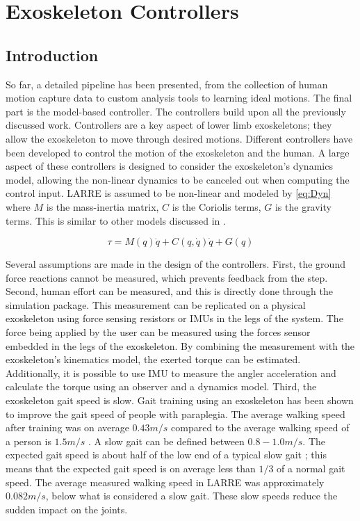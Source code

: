 \chapter{Exoskeleton Controllers}
\label{chap:controllers}
\section{Introduction}
So far, a detailed pipeline has been presented, from the collection of human motion capture data to custom analysis tools to learning ideal motions. The final part is the model-based controller. The controllers build upon all the previously discussed work.  
Controllers are a key aspect of lower limb exoskeletons; they allow the exoskeleton to move through desired motions. Different controllers have been developed to control the motion of the exoskeleton and the human. A large aspect of these controllers is designed to consider the exoskeleton's dynamics model, allowing the non-linear dynamics to be canceled out when computing the control input. LARRE is assumed to be non-linear and modeled by \autoref{eq:Dyn} where $M$ is the mass-inertia matrix, $C$ is the Coriolis terms, $G$ is the gravity terms. This is similar to other models discussed in \cite{huo2016active} \cite{vantilt2019model}.

\begin{equation}
    \tau = M(q) \ddot{q} + C(q, \dot{q}) \dot{q} + G(q)
    \label{eq:Dyn}
\end{equation}


Several assumptions are made in the design of the controllers. First, the ground force reactions cannot be measured, which prevents feedback from the step. Second, human effort can be measured, and this is directly done through the simulation package. This measurement can be replicated on a physical exoskeleton using force sensing resistors or IMUs in the legs of the system. The force being applied by the user can be measured using the forces sensor embedded in the legs of the exoskeleton. By combining the measurement with the exoskeleton's kinematics model, the exerted torque can be estimated. Additionally, it is possible to use IMU to measure the angler acceleration and calculate the torque using an observer and a dynamics model. Third, the exoskeleton gait speed is slow. Gait training using an exoskeleton has been shown to improve the gait speed of people with paraplegia. The average walking speed after training was on average $0.43m/s$ \cite{khan2019retraining} compared to the average walking speed of a person is $1.5m/s$ \cite{fitzpatrick2006another}. A slow gait can be defined between $0.8-1.0m/s$. The expected gait speed is about half of the low end of a typical slow gait \cite{walsh2007quasi}; this means that the expected gait speed is on average less than $1/3$ of a normal gait speed. The average measured walking speed in LARRE was approximately $0.082m/s$, below what is considered a slow gait. These slow speeds reduce the sudden impact on the joints. 

